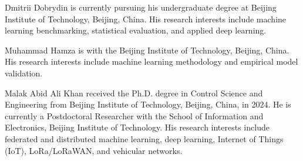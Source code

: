 \documentclass[journal]{IEEEtran}
\begin{document}
\begin{IEEEbiographynophoto}{Dmitrii Dobrydin}
is currently pursuing his undergraduate degree at Beijing Institute of Technology, Beijing, China. His research interests include machine learning benchmarking, statistical evaluation, and applied deep learning.
\end{IEEEbiographynophoto}

\begin{IEEEbiographynophoto}{Muhammad Hamza}
is with the Beijing Institute of Technology, Beijing, China. His research interests include machine learning methodology and empirical model validation.
\end{IEEEbiographynophoto}

\begin{IEEEbiographynophoto}{Malak Abid Ali Khan}
received the Ph.D. degree in Control Science and Engineering from Beijing Institute of Technology, Beijing, China, in 2024. He is currently a Postdoctoral Researcher with the School of Information and Electronics, Beijing Institute of Technology. His research interests include federated and distributed machine learning, deep learning, Internet of Things (IoT), LoRa/LoRaWAN, and vehicular networks.
\end{IEEEbiographynophoto}
\end{document}
